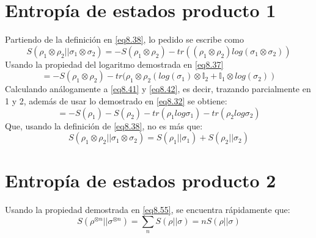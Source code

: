 \documentclass{book}
\begin{document}
\section{{Entropía de estados producto 1}} Partiendo de la definición en \ref{eq8.38}, lo pedido se escribe como
\begin{equation}\label{eq8.52}{S(\rho_1\otimes\rho_2||\sigma_1\otimes\sigma_2)=-S(\rho_1\otimes\rho_2)-tr((\rho_1\otimes\rho_2)log(\sigma_1\otimes\sigma_2))}\end{equation}
Usando la propiedad del logaritmo demostrada en \ref{eq8.37}
    \begin{equation}\label{eq8.53}{ =-S(\rho_1\otimes\rho_2)-tr(\rho_1\otimes\rho_2(log(\sigma_1)\otimes \mathbb{I}_2+\mathbb{I}_1\otimes log(\sigma_2))}\end{equation}
    Calculando análogamente a \ref{eq8.41} y \ref{eq8.42}, es decir, trazando parcialmente en 1 y 2, además de usar lo demostrado en \ref{eq8.32} se obtiene:
    \begin{equation}\label{eq8.54}{=-S(\rho_1)-S(\rho_2)-tr(\rho_1 log\sigma_1)-tr(\rho_2 log\sigma_2)}\end{equation}
    Que, usando la definición de \ref{eq8.38}, no es más que:
    \begin{equation}\label{eq8.55}{S(\rho_1\otimes\rho_2||\sigma_1\otimes\sigma_2)=S(\rho_1||\sigma_1)+S(\rho_2||\sigma_2)}\end{equation}
    \section{{Entropía de estados producto 2}} Usando la propiedad demostrada en \ref{eq8.55}, se encuentra rápidamente que:
    \begin{equation} \label{eq8.56}{S(\rho^{\otimes n}||\sigma^{\otimes n})=\sum_nS(\rho||\sigma)=nS(\rho||\sigma)}\end{equation}
\end{document}
